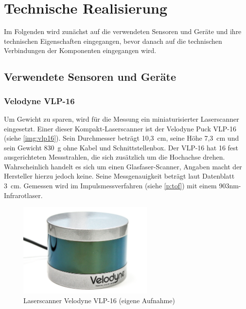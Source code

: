 \documentclass[a4paper,12pt,bibliography=totoc, listof=totoc,titlepage,pointlessnumbers]{scrreprt}
\begin{document}
\chapter{Technische Realisierung}
\label{c:realisierung}


Im Folgenden wird zunächst auf die verwendeten Sensoren und Geräte und ihre technischen Eigenschaften eingegangen, bevor danach auf die technischen Verbindungen der Komponenten eingegangen wird.

\section {Verwendete Sensoren und Geräte}

\subsection{Velodyne VLP-16}
\label{sss:vlp16}
Um Gewicht zu sparen, wird für die Messung ein miniaturisierter Laser\-scan\-ner eingesetzt. Einer dieser Kompakt-Laser\-scan\-ner ist der Velodyne Puck VLP-16 (siehe \autoref{img:vlp16}). Sein Durchmesser beträgt 10,3~cm, seine Höhe 7,3~cm  und sein Gewicht 830~g ohne Kabel und Schnittstellenbox. Der VLP-16 hat 16 fest ausgerichteten Messstrahlen, die sich zusätzlich um die Hochachse drehen. Wahrscheinlich handelt es sich um einen Glasfaser-Scanner, Angaben macht der Hersteller hierzu jedoch keine. Seine Messgenauigkeit beträgt laut Datenblatt 3~cm. Gemessen wird im Impulsmessverfahren (siehe \autoref{p:tof}) mit einem 903nm-Infrarotlaser. \citep{vlpSheet}

\begin{figure}[!ht]
 \centering
 \includegraphics[width=0.6\textwidth]{./img/vlp16.jpg}
 \caption{Laser\-scan\-ner Velodyne VLP-16 (eigene Aufnahme)}
 \label{img:vlp16}
\end{figure}
\end{document}
